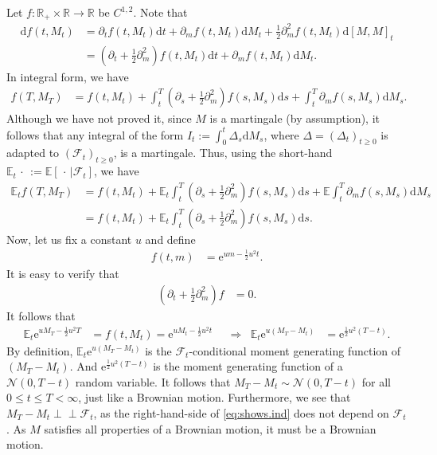 \documentclass[12pt]{book}
\numberwithin{equation}{chapter}
\theoremstyle{plain}
\numberwithin{theorem}{section}
\theoremstyle{definition}
\numberwithin{exercise}{chapter}
\let\oldendproof\endproof
\renewenvironment{proof}[1][\proofname]{%
  \oldproof[\scshape\underline{#1}]%
}{\oldendproof}
\newcommand{\<}{\langle}
\renewcommand{\>}{\rangle}
\renewcommand{\(}{\left(}
\renewcommand{\)}{\right)}
\renewcommand{\[}{\left[}
\renewcommand{\]}{\right]}
\newcommand\Eb{\mathds{E}}
\newcommand\Rb{\mathds{R}}
\newcommand\Fc{\mathscr{F}}
\newcommand\Nc{\mathscr{N}}
\newcommand\Del{\Delta}
\renewcommand\d{\partial}
\newcommand{\ind}{\perp \! \! \! \perp}
\newcommand\dd{\mathrm{d}}
\newcommand\ee{\mathrm{e}}
\begin{document}
\begin{proof}
Let $f: \Rb_+ \times \Rb \to \Rb$ be $C^{1,2}$.  Note that
\begin{align}
\dd f(t,M_t)
	&=	\d_t f(t,M_t) \dd t + \d_m f(t,M_t) \dd M_t + \tfrac{1}{2} \d_m^2 f(t,M_t) \dd [M,M]_t \\
	&=	\( \d_t + \tfrac{1}{2} \d_m^2 \) f(t,M_t) \dd t + \d_m f(t,M_t) \dd M_t .
\end{align}
In integral form, we have
\begin{align}
f(T,M_T)
	&=	f(t,M_t) + \int_t^T \( \d_s + \tfrac{1}{2} \d_m^2 \) f(s,M_s) \dd s + \int_t^T \d_m f(s,M_s) \dd M_s .
\end{align}
Although we have not proved it, since $M$ is a martingale (by assumption), it follows that any integral of the form $I_t := \int_0^t \Del_s \dd M_s$, where $\Del = (\Del_t)_{t \geq 0}$ is adapted to $(\Fc_t)_{t \geq 0}$, is a martingale.  Thus, using the short-hand $\Eb_t \, \cdot \,:= \Eb[ \, \cdot \, | \Fc_t]$, we have
\begin{align}
\Eb_t f(T,M_T)
	&=	f(t,M_t) + \Eb_t \int_t^T \( \d_s + \tfrac{1}{2} \d_m^2 \) f(s,M_s) \dd s + \Eb \int_t^T \d_m f(s,M_s) \dd M_s \\
	&=	f(t,M_t) + \Eb_t \int_t^T \( \d_s + \tfrac{1}{2} \d_m^2 \) f(s,M_s) \dd s .
\end{align}
Now, let us fix a constant $u$ and define
\begin{align}
f(t,m)
	&=	\ee^{ u m - \tfrac{1}{2} u^2 t} .
\end{align}
It is easy to verify that
\begin{align}
\( \d_t + \tfrac{1}{2} \d_m^2 \) f
	&=	0 .
\end{align}
It follows that
\begin{align}
\Eb_t \ee^{ u M_T - \tfrac{1}{2} u^2 T}
	&=	f(t,M_t) = \ee^{ u M_t - \tfrac{1}{2} u^2 t} &
	&		\Rightarrow &
\Eb_t \ee^{ u (M_T - M_t ) }
	&=	\ee^{ \tfrac{1}{2} u^2 (T -t ) }. \label{eq:shows.ind}
\end{align}
By definition, $\Eb_t \ee^{ u (M_T - M_t) }$ is the $\Fc_t$-conditional moment generating function of $(M_T - M_t)$.  And $\ee^{ \tfrac{1}{2} u^2 (T-t) }$ is the moment generating function of a $\Nc(0,T-t)$ random variable.  It follows that $M_T - M_t \sim \Nc(0,T-t)$ for all $0 \leq t \leq T < \infty$, just like a Brownian motion.  Furthermore, we see that $M_T - M_t \ind \Fc_t$, as the right-hand-side of \eqref{eq:shows.ind} does not depend on $\Fc_t$.  As $M$ satisfies all properties of a Brownian motion, it must be a Brownian motion.
\end{proof}
\end{document}
